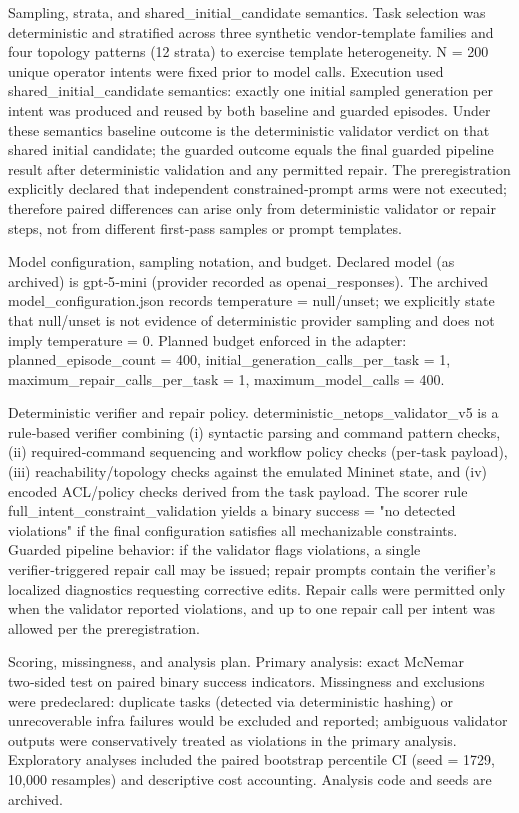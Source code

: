 \documentclass[conference]{IEEEtran}
\begin{document}
Sampling, strata, and shared\_initial\_candidate semantics. Task selection was deterministic and stratified across three synthetic vendor‑template families and four topology patterns (12 strata) to exercise template heterogeneity. N = 200 unique operator intents were fixed prior to model calls. Execution used shared\_initial\_candidate semantics: exactly one initial sampled generation per intent was produced and reused by both baseline and guarded episodes. Under these semantics baseline outcome is the deterministic validator verdict on that shared initial candidate; the guarded outcome equals the final guarded pipeline result after deterministic validation and any permitted repair. The preregistration explicitly declared that independent constrained‑prompt arms were not executed; therefore paired differences can arise only from deterministic validator or repair steps, not from different first‑pass samples or prompt templates.

Model configuration, sampling notation, and budget. Declared model (as archived) is gpt‑5‑mini (provider recorded as openai\_responses). The archived model\_configuration.json records temperature = null/unset; we explicitly state that null/unset is not evidence of deterministic provider sampling and does not imply temperature = 0. Planned budget enforced in the adapter: planned\_episode\_count = 400, initial\_generation\_calls\_per\_task = 1, maximum\_repair\_calls\_per\_task = 1, maximum\_model\_calls = 400.

Deterministic verifier and repair policy. deterministic\_netops\_validator\_v5 is a rule‑based verifier combining (i) syntactic parsing and command pattern checks, (ii) required‑command sequencing and workflow policy checks (per‑task payload), (iii) reachability/topology checks against the emulated Mininet state, and (iv) encoded ACL/policy checks derived from the task payload. The scorer rule full\_intent\_constraint\_validation yields a binary success = "no detected violations" if the final configuration satisfies all mechanizable constraints. Guarded pipeline behavior: if the validator flags violations, a single verifier‑triggered repair call may be issued; repair prompts contain the verifier's localized diagnostics requesting corrective edits. Repair calls were permitted only when the validator reported violations, and up to one repair call per intent was allowed per the preregistration.

Scoring, missingness, and analysis plan. Primary analysis: exact McNemar two‑sided test on paired binary success indicators. Missingness and exclusions were predeclared: duplicate tasks (detected via deterministic hashing) or unrecoverable infra failures would be excluded and reported; ambiguous validator outputs were conservatively treated as violations in the primary analysis. Exploratory analyses included the paired bootstrap percentile CI (seed = 1729, 10,000 resamples) and descriptive cost accounting. Analysis code and seeds are archived.
\end{document}
